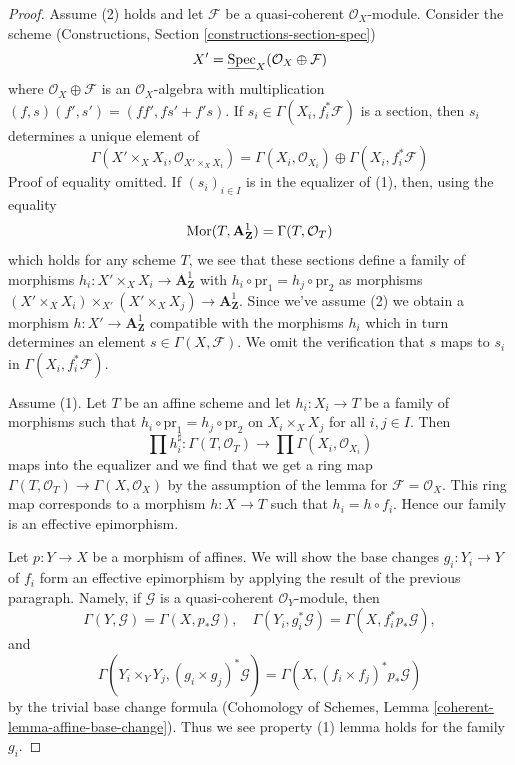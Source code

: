 \begin{proof}
Assume (2) holds and let $\mathcal{F}$ be a quasi-coherent
$\mathcal{O}_X$-module. Consider the scheme
(Constructions, Section \ref{constructions-section-spec})
$$
X' = \underline{\mathop{\mathrm{Spec}}}_X(\mathcal{O}_X \oplus \mathcal{F})
$$
where $\mathcal{O}_X \oplus \mathcal{F}$ is an
$\mathcal{O}_X$-algebra with multiplication
$(f, s)(f', s') = (ff', fs' + f's)$.
If $s_i \in \Gamma(X_i, f_i^*\mathcal{F})$ is a section,
then $s_i$ determines a unique element of
$$
\Gamma(X' \times_X X_i, \mathcal{O}_{X' \times_X X_i}) =
\Gamma(X_i, \mathcal{O}_{X_i}) \oplus \Gamma(X_i, f_i^*\mathcal{F})
$$
Proof of equality omitted.
If $(s_i)_{i \in I}$ is in the equalizer of (1), then, using the equality
$$
\mathop{\mathrm{Mor}}\nolimits(T, \mathbf{A}^1_\mathbf{Z}) = \Gamma(T, \mathcal{O}_T)
$$
which holds for any scheme $T$, we see that these sections define
a family of morphisms $h_i : X' \times_X X_i \to \mathbf{A}^1_\mathbf{Z}$ with
$h_i \circ \text{pr}_1 = h_j \circ \text{pr}_2$ as morphisms
$(X' \times_X X_i) \times_{X'} (X' \times_X X_j) \to \mathbf{A}^1_\mathbf{Z}$.
Since we've assume (2) we obtain a morphism
$h : X' \to \mathbf{A}^1_\mathbf{Z}$ compatible with the morphisms $h_i$
which in turn determines
an element $s \in \Gamma(X, \mathcal{F})$.
We omit the verification that $s$ maps to $s_i$ in
$\Gamma(X_i, f_i^*\mathcal{F})$.

\medskip\noindent
Assume (1). Let $T$ be an affine scheme and let $h_i : X_i \to T$
be a family of morphisms such that
$h_i \circ \text{pr}_1 = h_j \circ \text{pr}_2$ on
$X_i \times_X X_j$ for all $i, j \in I$. Then
$$
\prod h_i^\sharp :
\Gamma(T, \mathcal{O}_T)
\to
\prod \Gamma(X_i, \mathcal{O}_{X_i})
$$
maps into the equalizer and we find that we get a ring map
$\Gamma(T, \mathcal{O}_T) \to \Gamma(X, \mathcal{O}_X)$
by the assumption of the lemma for $\mathcal{F} = \mathcal{O}_X$.
This ring map corresponds to a morphism $h : X \to T$ such
that $h_i = h \circ f_i$. Hence our family is an effective
epimorphism.

\medskip\noindent
Let $p : Y \to X$ be a morphism of affines. We will show
the base changes $g_i : Y_i \to Y$ of $f_i$ form an effective epimorphism
by applying the result of the previous paragraph.
Namely, if $\mathcal{G}$ is a quasi-coherent $\mathcal{O}_Y$-module, then
$$
\Gamma(Y, \mathcal{G}) = \Gamma(X, p_*\mathcal{G}),\quad
\Gamma(Y_i, g_i^*\mathcal{G}) = \Gamma(X, f_i^*p_*\mathcal{G}),
$$
and
$$
\Gamma(Y_i \times_Y Y_j, (g_i \times g_j)^*\mathcal{G}) =
\Gamma(X, (f_i \times f_j)^*p_*\mathcal{G})
$$
by the trivial base change formula
(Cohomology of Schemes, Lemma \ref{coherent-lemma-affine-base-change}).
Thus we see property (1) lemma holds for the family $g_i$.
\end{proof}

